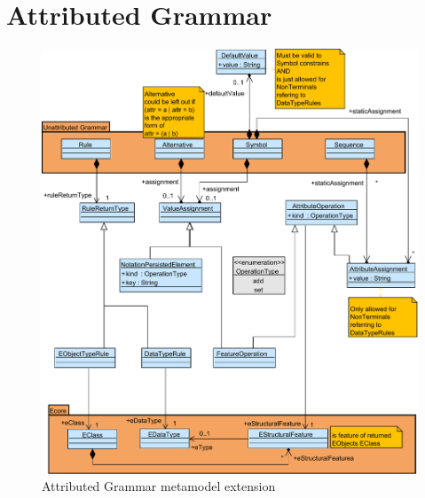 \section{Attributed Grammar}
\begin{figure}
\centering
\includegraphics[scale=0.7]{gfx/ex/Grammar_Attributed} 
\caption{Attributed Grammar metamodel extension}
\label{MM:AEBNF}
\end{figure}

